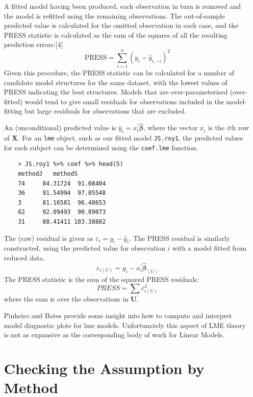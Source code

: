 \documentclass[Main.tex]{subfiles}
\begin{document}
A fitted model having been produced, each observation in turn is removed and the model is refitted using the remaining observations. The out-of-sample predicted value is calculated for the omitted observation in each case, and the PRESS statistic is calculated as the sum of the squares of all the resulting prediction errors:[4]
\[\mbox{PRESS} =\sum_{i=1}^n (y_i - \hat{y}_{i, -i})^2 \]
Given this procedure, the PRESS statistic can be calculated for a number of candidate model structures for the same dataset, with the lowest values of PRESS indicating the best structures. Models that are over-parameterised (over-fitted) would tend to give small residuals for observations included in the model-fitting but large residuals for observations that are excluded.

An (unconditional) predicted value is $\hat{y}_i = x^{\prime}_i \boldsymbol{\hat{\beta}}$, where 
the vector $x_i$ is the $i$th row of $\boldsymbol{X}$. For an \texttt{lme} object, such as our fitted model \texttt{JS.roy1}, the predicted values for each subject can be determined using the \texttt{coef.lme} function.
\begin{framed}
	\begin{verbatim}
	> JS.roy1 %>% coef %>% head(5)
	methodJ   methodS
	74     84.31724  91.08404
	36     91.54994  97.05548
	3      81.16581  96.48653
	62     92.09493  90.89073
	31     88.41411 103.38802
	\end{verbatim}
\end{framed}



The (raw) residual is given as $\varepsilon_i = y_i - \hat{y}_i$. The PRESS residual is
similarly constructed, using the predicted value for observation $i$ with a model fitted from reduced data.
\[ \varepsilon_{i(U)} = y_i - x^{\prime}_i \boldsymbol{\hat{\beta}}_{(U)} \]
The PRESS statistic is the sum of the squared PRESS residuals:
\[ PRESS = \sum \varepsilon^2_{i(U)} \]
where the sum is over the observations in $\boldsymbol{U}$.


\newpage

Pinheiro and Bates provide some insight into how to compute and interpret model diagnostic plots for lme models. Unfortunately this aspect of LME theory is not as expansive as the corresponding body of work for Linear Models.
\section{Checking the Assumption by Method}
\end{document}
